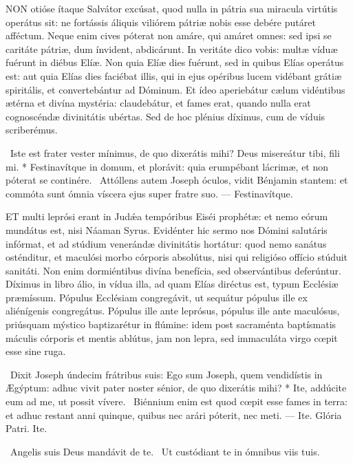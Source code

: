 
\lettrine[lines=2]{N}{ON} otióse ítaque Salvátor excúsat, quod nulla in pátria sua miracula virtútis operátus sit: ne fortássis áliquis viliórem pátriæ nobis esse debére putáret afféctum. Neque enim cives póterat non amáre, qui amáret omnes: sed ipsi se caritáte pátriæ, dum ínvident, abdicárunt. In veritáte dico vobis: multæ víduæ fuérunt in diébus Elíæ. Non quia Elíæ dies fuérunt, sed in quibus Elías operátus est: aut quia Elías dies faciébat illis, qui in ejus opéribus lucem vidébant grátiæ spiritális, et convertebántur ad Dóminum. Et ídeo aperiebátur cælum vidéntibus ætérna et divína mystéria: claudebátur, et fames erat, quando nulla erat cognoscéndæ divinitátis ubértas. Sed de hoc plénius díximus, cum de víduis scriberémus.

\R\ Iste est frater vester mínimus, de quo dixerátis mihi? Deus misereátur tibi, fili mi. * Festinavítque in domum, et plorávit: quia erumpébant lácrimæ, et non póterat se continére. \V\ Attóllens autem Joseph óculos, vidit Bénjamin stantem: et commóta sunt ómnia víscera ejus super fratre suo. --- Festinavítque.


\lettrine[lines=2]{E}{T} multi leprósi erant in Judǽa tempóribus Eiséi prophétæ: et nemo eórum mundátus est, nisi Náaman Syrus. Evidénter hic sermo nos Dómini salutáris infórmat, et ad stúdium venerándæ divinitátis hortátur: quod nemo sanátus osténditur, et maculósi morbo córporis absolútus, nisi qui religióso offício stúduit sanitáti. Non enim dormiéntibus divína benefícia, sed observántibus deferúntur. Díximus in libro álio, in vídua illa, ad quam Elías diréctus est, typum Ecclésiæ præmíssum. Pópulus Ecclésiam congregávit, ut sequátur pópulus ille ex aliénígenis congregátus. Pópulus ille ante leprósus, pópulus ille ante maculósus, priúsquam mýstico baptizarétur in flúmine: idem post sacraménta baptísmatis máculis córporis et mentis ablútus, jam non lepra, sed immaculáta virgo cœpit esse sine ruga.

\R\ Dixit Joseph úndecim frátribus suis: Ego sum Joseph, quem vendidístis in Ægýptum: adhuc vivit pater noster sénior, de quo dixerátis mihi? * Ite, addúcite eum ad me, ut possit vívere. \V\ Biénnium enim est quod cœpit esse fames in terra: et adhuc restant anni quinque, quibus nec arári póterit, nec meti. --- Ite. Glória Patri. Ite.

\V\ Angelis suis Deus mandávit de te. \R\ Ut custódiant te in ómnibus viis tuis.


